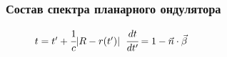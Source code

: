\documentclass[14pt, hyperref = {colorlinks}]{beamer}
\begin{document}
\small
\begin{frame}
\frametitle{Состав спектра планарного ондулятора}\label{t1}
\begin{figure}[h]
	\begin{minipage}[h]{0.49\linewidth}
		\vspace{-10pt}
	\end{minipage}	
	\begin{minipage}[h]{0.49\linewidth}
		\vspace{-10pt}
	\end{minipage}
\end{figure}
\vspace{-20pt}
\begin{figure}[h]
	$t = t' + \cfrac{1}{c} |R - r(t')|$ \hspace{40pt}$\cfrac{dt}{dt'} = 1 - \vec{n}\cdot\vec{\beta}$
\end{figure}
\end{frame}
\end{document}
